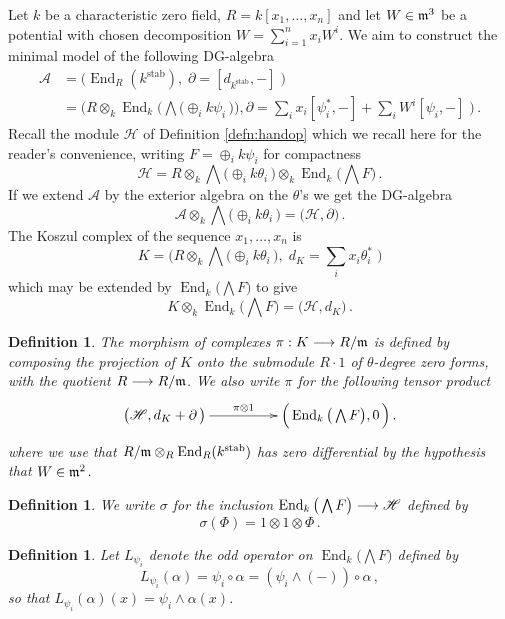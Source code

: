\documentclass[english,letter paper,12pt,leqno]{article}
\theoremstyle{example}
\newtheorem{definition}[theorem]{Definition}
\numberwithin{equation}{section}
\def\stab{\operatorname{stab}}
\def\be{\begin{equation}}
\def\ee{\end{equation}}
\DeclareMathOperator{\End}{End}
\begin{document}
Let $k$ be a characteristic zero field, $R =  k[x_1,\ldots,x_n]$ and let $W \in \mathfrak{m}^3$ be a potential with chosen decomposition $W = \sum_{i=1}^n x_i W^i$. We aim to construct the minimal model of the following DG-algebra
\begin{align*}
\mathscr{A} &= \Big( \End_{R}(k^{\operatorname{stab}}), \; \partial = [d_{k^{\stab}},-] \; \Big)\\
&= \Big( R \otimes_k \End_k\Big( \bigwedge\big( \oplus_i k\psi_i \,\big) \Big),  \partial = \sum_i x_i [\psi_i^*,-] + \sum_i W^i [\psi_i,-] \;\Big)\,.
\end{align*}
Recall the module $\mathscr{H}$ of Definition \ref{defn:handop} which we recall here for the reader's convenience, writing $F = \oplus_i k \psi_i$ for compactness
\[
\mathscr{H} = R \otimes_k \bigwedge\big( \oplus_i k \theta_i \,\big) \otimes_k \End_k\Big( \bigwedge F \Big)\,.
\]
If we extend $\mathscr{A}$ by the exterior algebra on the $\theta$'s we get the DG-algebra
\[
\mathscr{A} \otimes_k \bigwedge\big( \oplus_i k\theta_i \,\big) = \big( \mathscr{H}, \partial \big)\,.
\]
The Koszul complex of the sequence $x_1,\ldots,x_n$ is
\be\label{eq:defnkoszulK}
K = \Big( R \otimes_k \bigwedge\big( \oplus_i k \theta_i \,\big), \; d_K = \sum_i x_i \theta_i^*\; \Big)
\ee
which may be extended by $\End_k\big( \bigwedge F \big)$ to give
\[
K \otimes_k \End_k\big( \bigwedge F \big) = \big( \mathscr{H}, d_K \big)\,.
\]

\begin{definition} The morphism of complexes $\pi: K \longrightarrow R/\mathfrak{m}$ is defined by composing the projection of $K$ onto the submodule $R \cdot 1$ of $\theta$-degree zero forms, with the quotient $R \longrightarrow R/\mathfrak{m}$. We also write $\pi$ for the following tensor product
\[
\xymatrix@C+2pc{
\big( \mathscr{H}, d_K + \partial \,\big) \ar[r]^-{\pi \otimes 1} & \Big( \End_k\big( \bigwedge F \big), 0 \,\Big)\,.
}
\]
where we use that $R/\mf{m} \otimes_R \End_R(k^{\stab})$ has zero differential by the hypothesis that $W \in \mathfrak{m}^2$. 
\end{definition}

\begin{definition} We write $\sigma$ for the inclusion $\End_k\big( \bigwedge F \big) \lto \mathscr{H}$ defined by
\[
\sigma( \Phi ) = 1 \otimes 1 \otimes \Phi\,.
\]
\end{definition}

\begin{definition}\label{defn:lpsi} Let $L_{\psi_i}$ denote the odd operator on $\End_k\big( \bigwedge F \big)$ defined by
\[
L_{\psi_i}( \alpha ) = \psi_i \circ \alpha = (\psi_i \wedge (-)) \circ \alpha\,,
\]
so that $L_{\psi_i}(\alpha)(x) = \psi_i \wedge \alpha(x)$.
\end{definition}
\end{document}
